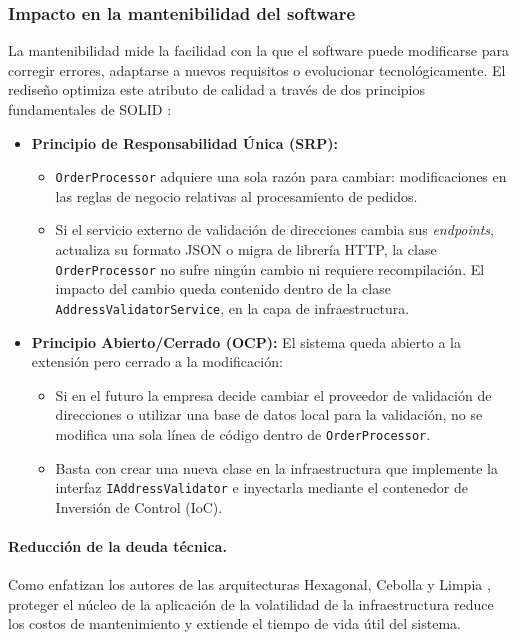 \subsubsection*{Impacto en la mantenibilidad del software}

La mantenibilidad mide la facilidad con la que el software puede modificarse para corregir errores, adaptarse a nuevos requisitos o evolucionar tecnológicamente. El rediseño optimiza este atributo de calidad a través de dos principios fundamentales de SOLID \parencite{martin2017}:

\begin{itemize}
    \item \textbf{Principio de Responsabilidad Única (SRP):}
    \begin{itemize}
        \item \texttt{OrderProcessor} adquiere una sola razón para cambiar: modificaciones en las reglas de negocio relativas al procesamiento de pedidos.
        \item Si el servicio externo de validación de direcciones cambia sus \emph{endpoints}, actualiza su formato JSON o migra de librería HTTP, la clase \texttt{OrderProcessor} no sufre ningún cambio ni requiere recompilación. El impacto del cambio queda contenido dentro de la clase \texttt{AddressValidatorService}, en la capa de infraestructura.
    \end{itemize}

    \item \textbf{Principio Abierto/Cerrado (OCP):} El sistema queda abierto a la extensión pero cerrado a la modificación:
    \begin{itemize}
        \item Si en el futuro la empresa decide cambiar el proveedor de validación de direcciones o utilizar una base de datos local para la validación, no se modifica una sola línea de código dentro de \texttt{OrderProcessor}.
        \item Basta con crear una nueva clase en la infraestructura que implemente la interfaz \texttt{IAddressValidator} e inyectarla mediante el contenedor de Inversión de Control (IoC).
    \end{itemize}
\end{itemize}

\paragraph{Reducción de la deuda técnica.} Como enfatizan los autores de las arquitecturas Hexagonal, Cebolla y Limpia \parencite{cockburn2005, palermo2008, martin2017}, proteger el núcleo de la aplicación de la volatilidad de la infraestructura reduce los costos de mantenimiento y extiende el tiempo de vida útil del sistema.